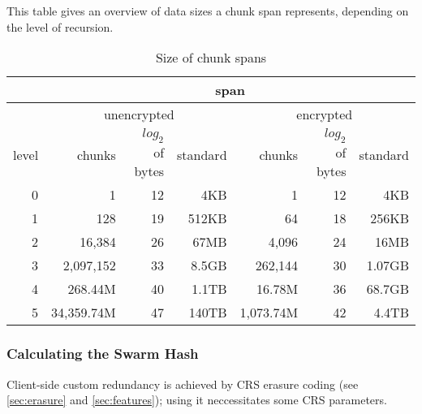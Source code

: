 
This table gives an overview of data sizes a chunk span represents, depending on the level of recursion.

\begin{table}[ht]
\begin{tabular}{|r||r|r|r||r|r|r|}
\hline
&\multicolumn{6}{|c|}{span}\\\hline
&\multicolumn{3}{|c|}{unencrypted}
&\multicolumn{3}{|c|}{encrypted}\\\hline
level & chunks & $\mathit{log}_2$ of bytes & standard & chunks & $\mathit{log}_2$ of bytes & standard \\
\hline\hline
0 & 1 & 12 & 4KB & 1 & 12 & 4KB \\\hline
1 & 128 & 19 & 512KB & 64 & 18 & 256KB \\\hline
2 & 16,384 & 26 & 67MB & 4,096 & 24 & 16MB \\\hline
3 & 2,097,152 &33 & 8.5GB & 262,144 &  30 & 1.07GB\\\hline
4 & 268.44M & 40  & 1.1TB & 16.78M & 36 & 68.7GB\\\hline
5 & 34,359.74M & 47 & 140TB & 1,073.74M & 42  & 4.4TB\\\hline
\end{tabular}
\caption{Size of chunk spans}
\end{table}




\subsubsection{Calculating the Swarm Hash}

Client-side custom redundancy is achieved by CRS erasure coding (see \ref{sec:erasure} and \ref{sec:features}); using it neccessitates some CRS parameters.
      
